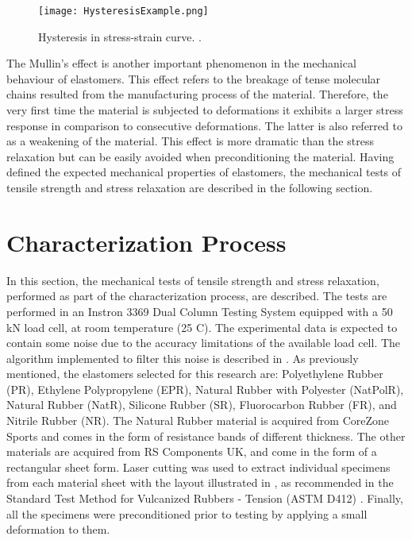 \begin{figure}[htb!]
    \centering
    \texttt{[image: HysteresisExample.png]}
    \caption{Hysteresis in stress-strain curve. \cite{Bauman2008}.}
    \label{fig:hysteresis}
\end{figure}

The Mullin's effect is another important phenomenon in the mechanical behaviour of elastomers. This effect refers to the breakage of tense molecular chains resulted from the manufacturing process of the material. Therefore, the very first time the material is subjected to deformations it exhibits a larger stress response in comparison to consecutive deformations. The latter is also referred to as a weakening of the material. This effect is more dramatic than the stress relaxation but can be easily avoided when preconditioning the material. Having defined the expected mechanical properties of elastomers, the mechanical tests of tensile strength and stress relaxation are described in the following section.

\section{Characterization Process} \label{sec:CharacterizationProcess}

In this section, the mechanical tests of tensile strength and stress relaxation, performed as part of the characterization process, are described. The tests are performed in an Instron 3369 Dual Column Testing System equipped with a 50 kN load cell, at room temperature (25 \degree{} C). The experimental data is expected to contain some noise due to the accuracy limitations of the available load cell. The algorithm implemented to filter this noise is described in  . As previously mentioned, the elastomers selected for this research are: Polyethylene Rubber (PR), Ethylene Polypropylene (EPR), Natural Rubber with Polyester (NatPolR), Natural Rubber (NatR), Silicone Rubber (SR), Fluorocarbon Rubber (FR), and Nitrile Rubber (NR). The Natural Rubber material is acquired from CoreZone Sports\textregistered{} and comes in the form of resistance bands of different thickness. The other materials are acquired from RS Components UK\textregistered{}, and come in the form of a rectangular sheet form. Laser cutting was used to extract individual specimens from each material sheet with the layout illustrated in , as recommended in the Standard Test Method for Vulcanized Rubbers - Tension (ASTM D412) \cite{astmd412}. Finally, all the specimens were preconditioned prior to testing by applying a small deformation to them.

